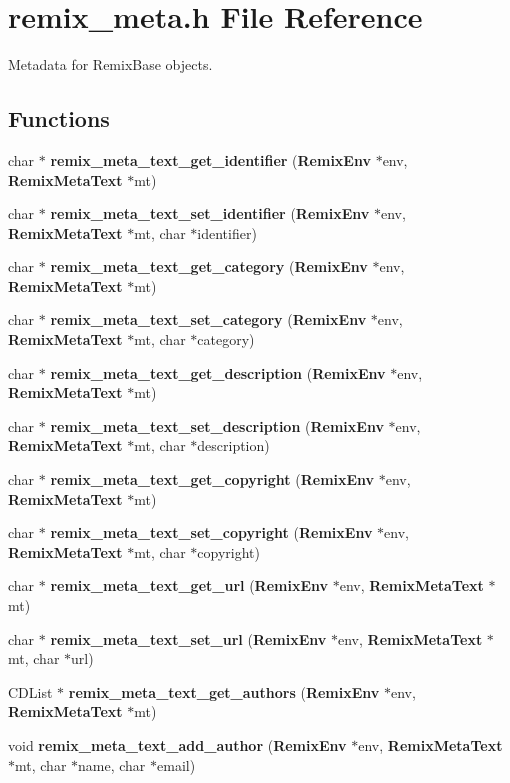 \section{remix\_\-meta.h File Reference}
\label{remix__meta_8h}


Metadata for RemixBase objects.  


\subsection*{Functions}
\begin{DoxyCompactItemize}
\item 
char $\ast$ {\bf remix\_\-meta\_\-text\_\-get\_\-identifier} ({\bf RemixEnv} $\ast$env, {\bf RemixMetaText} $\ast$mt)
\item 
char $\ast$ {\bf remix\_\-meta\_\-text\_\-set\_\-identifier} ({\bf RemixEnv} $\ast$env, {\bf RemixMetaText} $\ast$mt, char $\ast$identifier)
\item 
char $\ast$ {\bf remix\_\-meta\_\-text\_\-get\_\-category} ({\bf RemixEnv} $\ast$env, {\bf RemixMetaText} $\ast$mt)
\item 
char $\ast$ {\bf remix\_\-meta\_\-text\_\-set\_\-category} ({\bf RemixEnv} $\ast$env, {\bf RemixMetaText} $\ast$mt, char $\ast$category)
\item 
char $\ast$ {\bf remix\_\-meta\_\-text\_\-get\_\-description} ({\bf RemixEnv} $\ast$env, {\bf RemixMetaText} $\ast$mt)
\item 
char $\ast$ {\bf remix\_\-meta\_\-text\_\-set\_\-description} ({\bf RemixEnv} $\ast$env, {\bf RemixMetaText} $\ast$mt, char $\ast$description)
\item 
char $\ast$ {\bf remix\_\-meta\_\-text\_\-get\_\-copyright} ({\bf RemixEnv} $\ast$env, {\bf RemixMetaText} $\ast$mt)
\item 
char $\ast$ {\bf remix\_\-meta\_\-text\_\-set\_\-copyright} ({\bf RemixEnv} $\ast$env, {\bf RemixMetaText} $\ast$mt, char $\ast$copyright)
\item 
char $\ast$ {\bf remix\_\-meta\_\-text\_\-get\_\-url} ({\bf RemixEnv} $\ast$env, {\bf RemixMetaText} $\ast$mt)
\item 
char $\ast$ {\bf remix\_\-meta\_\-text\_\-set\_\-url} ({\bf RemixEnv} $\ast$env, {\bf RemixMetaText} $\ast$mt, char $\ast$url)
\item 
CDList $\ast$ {\bf remix\_\-meta\_\-text\_\-get\_\-authors} ({\bf RemixEnv} $\ast$env, {\bf RemixMetaText} $\ast$mt)
\item 
void {\bf remix\_\-meta\_\-text\_\-add\_\-author} ({\bf RemixEnv} $\ast$env, {\bf RemixMetaText} $\ast$mt, char $\ast$name, char $\ast$email)
\end{DoxyCompactItemize}


